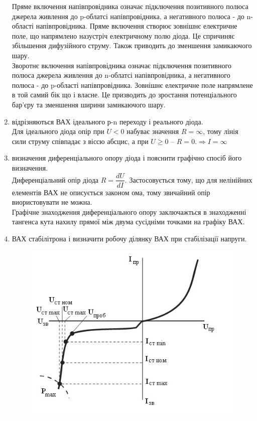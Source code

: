 \documentclass[12pt]{article}
\begin{document}
\begin{enumerate}
    Пряме включення напівпровідника означає підключення позитивного полюса джерела живлення до p-облатсі напівпровідника, а негативного полюса - до n-області напівпровідника. Пряме включення створює зовнішнє електричне поле, що напрямлено назустріч електричному полю діода. Це спричиняє збільшення дифузійного струму. Також приводить до зменшення замикаючого шару.\\
    Зворотнє включення напівпровідника означає підключення позитивного полюса джерела живлення до n-облатсі напівпровідника, а негативного полюса - до p-області напівпровідника. Зовнішнє електричне поле напрямлене в той самий бік що і власне. Це призводить до зростання потенціального бар'єру та зменшення ширини замикаючого шару.
    \item
        { відрізняються ВАХ ідеального р-n переходу і реального діода.}\\
    Для ідеального діода опір при $U < 0$ набуває значення $R = \infty $, тому лінія сили струму співпадає з віссю абсцис, а при $U \geq 0 $ -- $ R = 0. \Rightarrow I=\infty$
    \item
        { визначення диференціального опору діода і пояснити графічно
спосіб його визначення.}\\
    Диференціальний опір діода $R=\dfrac{dU}{dI}$. Застосовується тому, що для нелінійних елементів ВАХ не описується законом ома, тому звичайний опір виористовувати не можна.\\
    Графічне знаходження диференціального опору заключажться в знаходженні тангенса кута нахилу прямої між двума сусідніми точками на графіку ВАХ.
    \item
        { ВАХ стабілітрона і визначити робочу ділянку ВАХ при
стабілізації напруги.}\\
    \begin{figure}[!ht]
      \centering
      \includegraphics[scale=0.8]{problem8.jpg}

\end{figure}
\end{enumerate}
\end{document}
